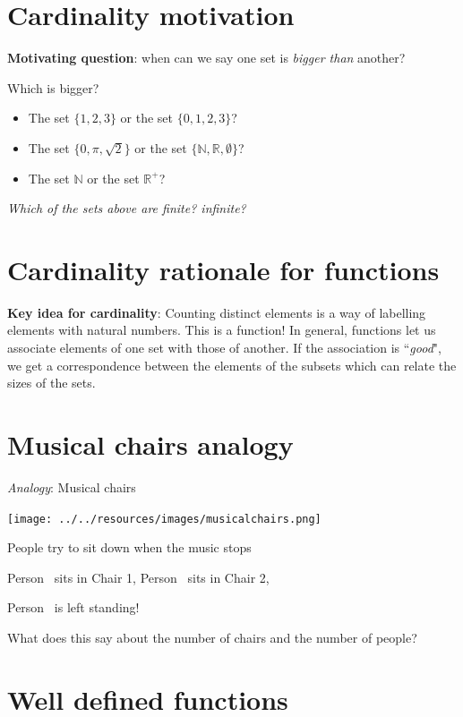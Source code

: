 \documentclass[12pt, oneside]{article}
\begin{document}
\section*{Cardinality motivation}


{\bf Motivating question}: when can we say one set is {\it bigger than} another?

Which is bigger? 
\begin{itemize}
    \item The set $\{1,2,3\}$ or the set $\{0,1,2,3\}$?
    \item The set $\{0, \pi, \sqrt{2} \}$ or the set $\{\mathbb{N}, \mathbb{R}, \emptyset\}$?
    \item The set $\mathbb{N}$ or the set $\mathbb{R}^+$?
\end{itemize}

{\it Which of the sets above are finite? infinite?} \vfill
\section*{Cardinality rationale for functions}


{\bf Key idea for cardinality}: Counting 
distinct elements is a way of labelling elements
with natural numbers. This is a function!
In general, functions let us 
associate elements of one set with those
of another. If the association is ``{\it good}", 
we get a correspondence between the elements of the subsets
which can relate the sizes of the sets. \vfill
\section*{Musical chairs analogy}


{\it Analogy}: Musical chairs

\begin{multicols}{2}
\texttt{[image: ../../resources/images/musicalchairs.png]}
\columnbreak

People try to sit down when the music stops

Person\sun~ sits in Chair 1,
Person\smiley~ sits in Chair 2,

Person\frownie~  is left standing!
\end{multicols}
What does this say about the number of chairs and the number of people?

\vspace{100pt} \vfill
\section*{Well defined functions}
\end{document}

